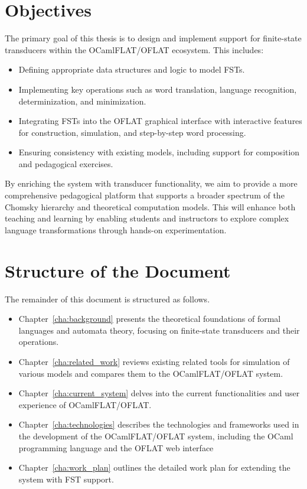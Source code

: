 \section{Objectives}

The primary goal of this thesis is to design and implement support for finite-state transducers within the OCamlFLAT/OFLAT ecosystem. This includes:
\begin{itemize}
  \item Defining appropriate data structures and logic to model FSTs.
  \item Implementing key operations such as word translation, language recognition, determinization, and minimization.
  \item Integrating FSTs into the OFLAT graphical interface with interactive features for construction, simulation, and step-by-step word processing.
  \item Ensuring consistency with existing models, including support for composition and pedagogical exercises.
\end{itemize}

By enriching the system with transducer functionality, we aim to provide a more comprehensive pedagogical platform that supports a broader spectrum of the 
Chomsky hierarchy and theoretical computation models. This will enhance both teaching and learning by enabling students and instructors to explore complex language 
transformations through hands-on experimentation.

\section{Structure of the Document}

The remainder of this document is structured as follows. 
\begin{itemize}
  \item Chapter~\ref{cha:background} presents the theoretical foundations of formal languages and automata theory, focusing on finite-state transducers and their operations. 
  \item Chapter~\ref{cha:related_work} reviews existing related tools for simulation of various models and compares them to the OCamlFLAT/OFLAT system. 
  \item Chapter~\ref{cha:current_system} delves into the current functionalities and user experience of OCamlFLAT/OFLAT. 
  \item Chapter~\ref{cha:technologies} describes the technologies and frameworks used in the development of the OCamlFLAT/OFLAT system, including the OCaml programming language and the OFLAT web interface
  \item Chapter~\ref{cha:work_plan} outlines the detailed work plan for extending the system with FST support.
\end{itemize}

